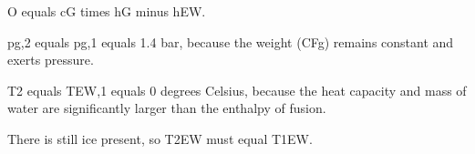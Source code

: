 O equals cG times hG minus hEW.  

pg,2 equals pg,1 equals 1.4 bar, because the weight (CFg) remains constant and exerts pressure.  

T2 equals TEW,1 equals 0 degrees Celsius, because the heat capacity and mass of water are significantly larger than the enthalpy of fusion.  

There is still ice present, so T2EW must equal T1EW.